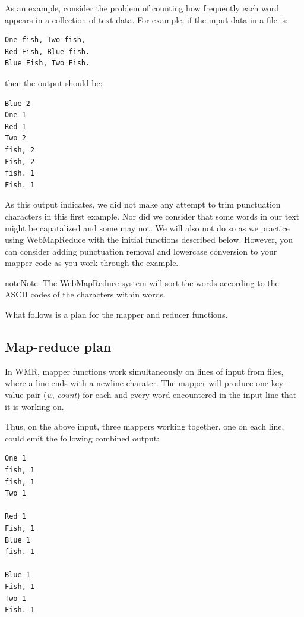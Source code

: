 \documentclass[letterpaper,10pt,openany,oneside]{sphinxmanual}
\begin{document}
As an example, consider the problem of counting how frequently each
word appears in a collection of text data. For example, if the input
data in a file is:

\begin{Verbatim}[commandchars=\\\{\}]
One fish, Two fish,
Red Fish, Blue fish.
Blue Fish, Two Fish.
\end{Verbatim}

then the output should be:

\begin{Verbatim}[commandchars=\\\{\}]
Blue 2
One 1
Red 1
Two 2
fish, 2
Fish, 2
fish. 1
Fish. 1
\end{Verbatim}

As this output indicates, we did not make any attempt to trim
punctuation characters in this first example. Nor did we consider that
some words in our text might be capatalized and some may not.
We will also not do so as we
practice using WebMapReduce with the initial functions described
below. However, you can consider adding punctuation removal and
lowercase conversion to your mapper code as you work through the example.

\begin{notice}{note}{Note:}
The WebMapReduce system will sort the words
according to the ASCII codes of the characters within words.
\end{notice}

What follows is a plan for the mapper and reducer functions.


\subsection{Map-reduce plan}
\label{wmr_basic/wmr_multi_language:map-reduce-plan}
In WMR, mapper functions work simultaneously on lines of input from
files, where a line ends with a newline charater. The mapper will
produce one key-value pair (\emph{w}, \emph{count}) for each and every word encountered
in the input line that it is working on.

Thus, on the above input, three mappers working together, one on each line,
could emit the following combined output:

\begin{Verbatim}[commandchars=\\\{\}]
One 1
fish, 1
fish, 1
Two 1

Red 1
Fish, 1
Blue 1
fish. 1

Blue 1
Fish, 1
Two 1
Fish. 1
\end{Verbatim}
\end{document}
